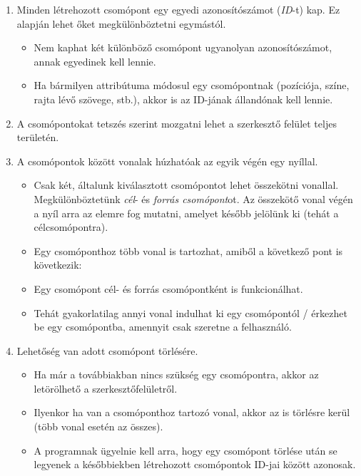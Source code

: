 \begin{enumerate}
\item Minden létrehozott csomópont egy egyedi azonosítószámot (\textit{ID}-t) kap. Ez alapján lehet őket megkülönböztetni egymástól.

\begin{itemize}
\item Nem kaphat két különböző csomópont ugyanolyan azonosítószámot, annak egyedinek kell lennie.
\item Ha bármilyen attribútuma módosul egy csomópontnak (pozíciója, színe, rajta lévő szövege, stb.), akkor is az ID-jának állandónak kell lennie.
\end{itemize}

\item A csomópontokat tetszés szerint mozgatni lehet a szerkesztő felület teljes területén.

\item A csomópontok között vonalak húzhatóak az egyik végén egy nyíllal.

\begin{itemize}
\item Csak két, általunk kiválasztott csomópontot lehet összekötni vonallal. Megkülönböztetünk \textit{cél}- és \textit{forrás csomópont}ot. Az összekötő vonal végén a nyíl arra az elemre fog mutatni, amelyet később jelölünk ki (tehát a célcsomópontra).
\item Egy csomóponthoz több vonal is tartozhat, amiből a következő pont is következik:
\item Egy csomópont cél- és forrás csomópontként is funkcionálhat.
\item Tehát gyakorlatilag annyi vonal indulhat ki egy csomópontól / érkezhet be egy csomópontba, amennyit csak szeretne a felhasználó.
\end{itemize}

\item Lehetőség van adott csomópont törlésére.

\begin{itemize}
\item Ha már a továbbiakban nincs szükség egy csomópontra, akkor az letörölhető a szerkesztőfelületről.
\item Ilyenkor ha van a csomóponthoz tartozó vonal, akkor az is törlésre kerül (több vonal esetén az összes).
\item A programnak ügyelnie kell arra, hogy egy csomópont törlése után se legyenek a későbbiekben létrehozott csomópontok ID-jai között azonosak.
\end{itemize}

\end{enumerate}

